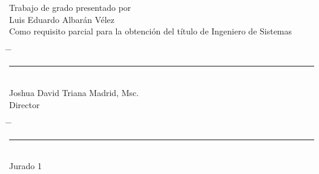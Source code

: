 \documentclass[../Main.tex]{subfiles}
\begin{document}
\thispagestyle{empty} %
\vspace*{3cm}
\begin{center}
Trabajo de grado presentado por\\
Luis Eduardo Albarán Vélez\\
Como requisito parcial para la obtención del título de Ingeniero de Sistemas
\end{center}
\vfill
\vfill
\vfill
\begin{center}
\begin{tabbing}
\hspace{0.05\textwidth} \= \hspace{0.05\textwidth} \= \kill
\rule{70mm}{0.1mm} \\
Joshua David Triana Madrid, Msc.\\
Director
\end{tabbing}
\end{center}
\vfill
\vfill
\vfill
\begin{center}
\begin{tabbing}
\hspace{0.05\textwidth} \= \hspace{0.05\textwidth} \= \kill
\rule{70mm}{0.1mm} \> \rightline{\rule{70mm}{0.1mm}} \\
Jurado 1 \> 
\end{tabbing}
\end{center}
\vfill
\vfill
\vfill
\vfill
\end{document}
